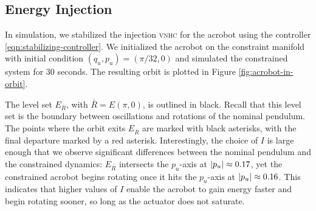 \documentclass[journal,twoside,web, twocolumn,draftcls]{ieeecolor}
\DeclarePairedDelimiter{\abs}{\lvert}{\rvert}
\newcommand*{\vnhc}{\textsc{vnhc}\xspace}
\begin{document}
\begin{table}
    \centering
    \caption{Physical parameters for the real acrobot.}
    \label{tab:acrobot-parameters}
\end{table}

\subsection{Energy Injection}

In simulation, we stabilized the injection \vnhc for the acrobot using the
controller \eqref{eqn:stabilizing-controller}.
We initialized the acrobot on the constraint manifold
with initial condition \((q_u,p_u) = \left(\pi/32,0 \right)\) and simulated the
constrained system for \(30\) seconds.
The resulting orbit is plotted in Figure
\ref{fig:acrobot-in-orbit}.

The level set \(E_{\bar R}\), with \(\bar R=E(\pi,0)\), is outlined in black.
Recall that this level set is the boundary between oscillations and rotations of the
nominal pendulum.
The points where the orbit exits \(E_{\bar R}\) are marked with black asterisks,
with the final departure marked by a red asterisk.
Interestingly, the choice of \(I\) is large enough that we observe significant
differences between the nominal pendulum and the constrained dynamics:
\(E_{\bar R}\) intersects the \(p_u\)-axis at \(\abs{p_u} \approx 0.17\), yet the
constrained acrobot begins rotating once it hits the
\(p_u\)-axis at \(\abs{p_u} \approx 0.16\). 
This indicates that higher values of \(I\) enable the acrobot to gain energy
faster and begin rotating sooner, so long as the actuator does not saturate.
\end{document}
